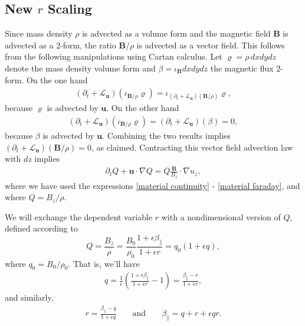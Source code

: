 \documentclass{article}
\newcommand{\para}{\parallel}
\newcommand{\ep}{\epsilon}
\newcommand{\pth} [1] {\left( #1 \right) }
\begin{document}
\subsection{New $r$ Scaling}
Since mass density $\rho$ is advected as a volume form and the magnetic field $\bm{B}$ is advected as a $2$-form, the ratio $\bm{B}/\rho$ is advected as a vector field. This follows from the following manipulations using Cartan calculus. Let $\varrho = \rho\,dxdydz$ denote the mass density volume form and $\beta = \iota_{\bm{B}}dxdydz$ the magnetic flux $2$-form. On the one hand
\begin{align*}
(\partial_t + \mathcal{L}_{\bm{u}})(\iota_{\bm{B}/\rho}\varrho) = \iota_{(\partial_t + \mathcal{L}_{\bm{u}})(\bm{B}/\rho)}\varrho,
\end{align*}
because $\varrho$ is advected by $\bm{u}$. On the other hand 
\begin{align*}
(\partial_t + \mathcal{L}_{\bm{u}})(\iota_{\bm{B}/\rho}\varrho) = (\partial_t + \mathcal{L}_{\bm{u}})(\beta) = 0,
\end{align*}
because $\beta$ is advected by $\bm{u}$. Combining the two results implies $(\partial_t + \mathcal{L}_{\bm{u}})(\bm{B}/\rho) = 0$, as claimed. Contracting this vector field advection law with $dz$ implies 
\begin{align} \label{Qevolution}
\partial_tQ + \bm{u}\cdot\nabla Q = Q\frac{\bm{B}}{B_z}\cdot\nabla u_z,
\end{align}
where we have used the expressions \eqref{material continuity} - \eqref{material faraday}, and where $Q = B_z/\rho$.

We will exchange the dependent variable $r$ with a nondimensional version of $Q$, defined according to 
\begin{equation} 
    Q = \frac{B_z}{\rho} = \frac{B_0}{\rho_0} \frac{1+\ep\beta_\para}{1+\ep r} = q_0 (1+\ep q), 
\end{equation}
where $q_0 = B_0/\rho_0$. That is, we'll have 
\begin{align} \label{qdefinition}
    q = \frac{1}{\ep} \pth{\frac{1+\ep\beta_\para}{1+\ep r} - 1} = \frac{\beta_\para - r}{1+\ep r}, 
\end{align}
and similarly, 
\begin{align} 
    r = \frac{\beta_\para - q}{1+\ep q} && \text{ and } && \beta_\para = q+r+\ep qr.
\end{align}
\end{document}
